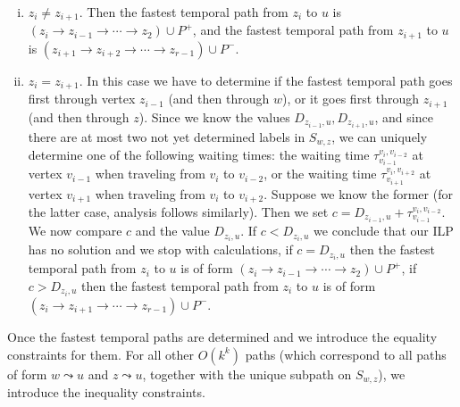\documentclass[11pt,a4paper]{article}
\theoremstyle{remark}
\theoremstyle{definition}
\begin{document}
\begin{enumerate}[(i)]
    \item \label{FPT:equality-fromUtoX-twosplit}
    $z_i \neq z_{i+1}$.
    Then the fastest temporal path from $z_i$ to $u$ is 
    $(z_i \rightarrow z_{i-1} \rightarrow \cdots \rightarrow z_2) \cup P^+$,
    and 
    the fastest temporal path from $z_{i+1}$ to $u$ is 
    $(z_{i+1} \rightarrow z_{i+2} \rightarrow \cdots \rightarrow z_{r-1}) \cup P^-$.
    \item \label{FPT:equality-fromUtoX-onesplit}
    $z_i = z_{i+1}$.
    In this case we have to determine if the fastest temporal path goes first through vertex $z_{i-1}$ (and then through $w$),
    or it goes first through $z_{i+1}$ (and then through $z$).
    Since we know the values $D_{z_{i-1},u}, D_{z_{i+1},u}$,
    and since there are at most two not yet determined labels in $S_{w,z}$,
    we can uniquely determine one of the following
    waiting times:
    the waiting time $\tau_{v_{i-1}} ^{v_{i}, v_{i-2}}$ at vertex $v_{i-1}$ when traveling from $v_i$ to $v_{i-2}$,
    or
    the waiting time $\tau_{v_{i+1}} ^{v_{i}, v_{i+2}}$ at vertex $v_{i+1}$ when traveling from $v_i$ to $v_{i+2}$.
    Suppose we know the former (for the latter case, analysis follows similarly).
    Then we set $c = D_{z_{i-1},u} +  \tau_{v_{i-1}} ^{v_{i}, v_{i-2}}$.
    We now compare $c$ and the value $D_{z_{i},u}$.
    If $c < D_{z_{i},u}$ we conclude that our ILP has no solution and we stop with calculations,
    if $c = D_{z_{i},u}$ then the fastest temporal path from $z_i$ to $u$ is of form $(z_i \rightarrow z_{i-1} \rightarrow \cdots \rightarrow z_2) \cup P^+$,
    if $c > D_{z_{i},u}$ then the fastest temporal path from $z_i$ to $u$ is of form $(z_i \rightarrow z_{i+1} \rightarrow \cdots \rightarrow z_{r-1}) \cup P^-$.
\end{enumerate}
Once the fastest temporal paths are determined and we introduce the equality constraints for them.
For all other $O(k^k)$ paths (which correspond to all paths of form $w \leadsto u$ and $z \leadsto u$, together with the unique subpath on $S_{w,z}$),
we introduce the inequality constraints.
\end{document}
